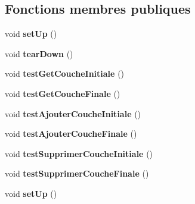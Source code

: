 \subsection*{Fonctions membres publiques}
\begin{DoxyCompactItemize}
\item 
\mbox{\label{class_test_reseau_neurones_a96258fba3363e463ae230849f4e3c236}} 
void {\bfseries set\+Up} ()
\item 
\mbox{\label{class_test_reseau_neurones_ae52666ac7cb0176354c7d3b4306deec0}} 
void {\bfseries tear\+Down} ()
\item 
\mbox{\label{class_test_reseau_neurones_aaf72a0dbcbb46dbdbfb36fe61514d59d}} 
void {\bfseries test\+Get\+Couche\+Initiale} ()
\item 
\mbox{\label{class_test_reseau_neurones_a9808a8c9c28f167845db1e6f57435bb3}} 
void {\bfseries test\+Get\+Couche\+Finale} ()
\item 
\mbox{\label{class_test_reseau_neurones_a2aa4cdb205ead6f6275db97894c1be09}} 
void {\bfseries test\+Ajouter\+Couche\+Initiale} ()
\item 
\mbox{\label{class_test_reseau_neurones_a2cc008d42aff3d270ae3e1f935fbf6b8}} 
void {\bfseries test\+Ajouter\+Couche\+Finale} ()
\item 
\mbox{\label{class_test_reseau_neurones_a289a476c4f62458cb9ded841ea1b4148}} 
void {\bfseries test\+Supprimer\+Couche\+Initiale} ()
\item 
\mbox{\label{class_test_reseau_neurones_a0e733607d7e5bbd48a3d6e5b62d5991f}} 
void {\bfseries test\+Supprimer\+Couche\+Finale} ()
\item 
\mbox{\label{class_test_reseau_neurones_a96258fba3363e463ae230849f4e3c236}} 
void {\bfseries set\+Up} ()
\item 
\mbox{\label{class_test_reseau_neurones_ae52666ac7cb0176354c7d3b4306deec0}} 

\end{DoxyCompactItemize}
